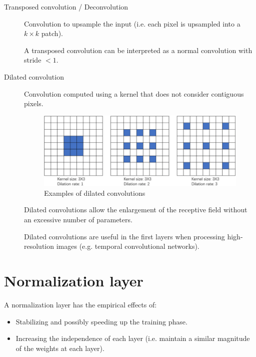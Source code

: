 \begin{description}
    \item[Transposed convolution / Deconvolution] 
        Convolution to upsample the input (i.e. each pixel is upsampled into a $k \times k$ patch).

        \begin{remark}
            A transposed convolution can be interpreted as a normal convolution with stride $< 1$.
        \end{remark}


    \item[Dilated convolution] 
        Convolution computed using a kernel that does not consider contiguous pixels.

        \begin{figure}[H]
            \centering
            \includegraphics[width=0.5\linewidth]{./img/dilated_convolution.png}
            \caption{Examples of dilated convolutions}
        \end{figure}

        \begin{remark}
            Dilated convolutions allow the enlargement of the receptive field without an excessive number of parameters.
        \end{remark}

        \begin{remark}
            Dilated convolutions are useful in the first layers when processing high-resolution images (e.g. temporal convolutional networks).
        \end{remark}
\end{description}




\section{Normalization layer}

A normalization layer has the empirical effects of:
\begin{itemize}
    \item Stabilizing and possibly speeding up the training phase.
    \item Increasing the independence of each layer (i.e. maintain a similar magnitude of the weights at each layer).
\end{itemize}


